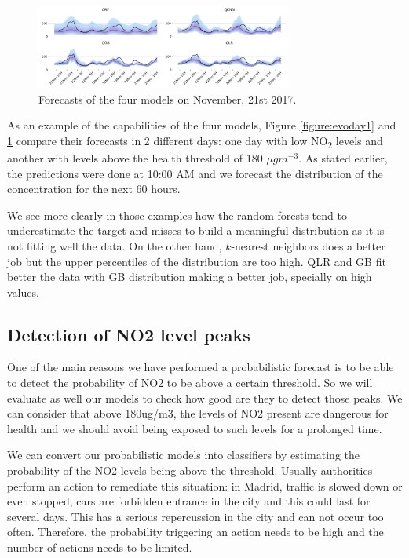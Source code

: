 \documentclass[a4paper,twocolumn,5p]{elsarticle}
\begin{document}
\begin{figure}
  \centering
  \includegraphics[width=0.75\textwidth]{evoday2}
  \caption{Forecasts of the four models on November, 21st 2017.  }
  \label{figure:evoday2} 
\end{figure}

As an example of the capabilities of the four models, Figure
\ref{figure:evoday1} and \ref{figure:evoday2} compare their forecasts
in 2 different days: one day with low NO\textsubscript{2} levels and
another with levels above the health threshold of 180 $\mu gm^{-3}$.
As stated earlier, the predictions were done at 10:00 AM and we
forecast the distribution of the concentration for the next 60 hours.

We see more clearly in those examples how the random forests tend to
underestimate the target and misses to build a meaningful distribution
as it is not fitting well the data. On the other hand, $k$-nearest
neighbors does a better job but the upper percentiles of the
distribution are too high.  QLR and GB fit better the data with GB
distribution making a better job, specially on high values.


\subsection{Detection of NO2 level peaks}

One of the main reasons we have performed a probabilistic forecast 
is to be able to detect the probability of NO2 to be above a certain 
threshold. So we will evaluate as well our models to check how 
good are they to detect those peaks. 
We can consider that above 180ug/m3, the levels of NO2 present 
are dangerous for health and we should avoid being exposed to 
such levels for a prolonged time. 

We can convert our probabilistic models into classifiers by estimating 
the probability of the NO2 levels being above the threshold. 
Usually authorities perform an action to remediate this situation:
in Madrid, traffic is slowed down or even stopped, cars are forbidden 
entrance in the city and this could last for several days. This has 
a serious repercussion in the city and can not occur too often.
Therefore, the probability triggering an action needs to be high and 
the number of actions needs to be limited.
\end{document}
